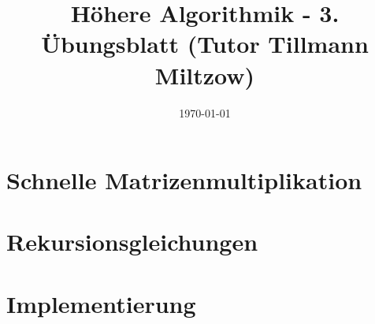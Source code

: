 \documentclass[a4paper,10pt]{scrartcl}
\title{H\"ohere Algorithmik - 3. \"Ubungsblatt (Tutor Tillmann Miltzow)}
\author{\Authors}
\date{\today}
\begin{document}
\maketitle

\section{Schnelle Matrizenmultiplikation}

\section{Rekursionsgleichungen}

\section{Implementierung}
\end{document}
